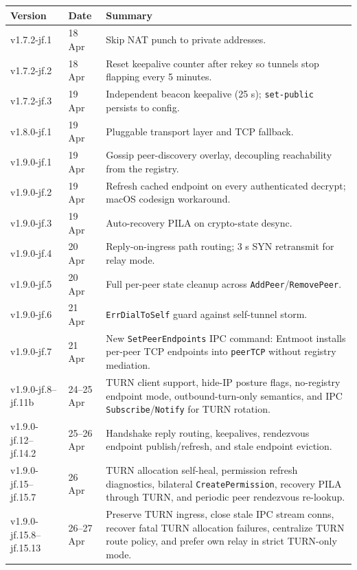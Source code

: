 \documentclass[11pt,a4paper]{article}
\begin{document}
\begin{table}[h]
\centering
\small
\begin{tabular}{@{}llp{7cm}@{}}
\toprule
Version & Date & Summary \\
\midrule
v1.7.2-jf.1 & 18 Apr & Skip NAT punch to private addresses. \\
v1.7.2-jf.2 & 18 Apr & Reset keepalive counter after rekey so tunnels stop flapping every 5 minutes. \\
v1.7.2-jf.3 & 19 Apr & Independent beacon keepalive (25 s); \texttt{set-public} persists to config. \\
v1.8.0-jf.1 & 19 Apr & Pluggable transport layer and TCP fallback. \\
v1.9.0-jf.1 & 19 Apr & Gossip peer-discovery overlay, decoupling reachability from the registry. \\
v1.9.0-jf.2 & 19 Apr & Refresh cached endpoint on every authenticated decrypt; macOS codesign workaround. \\
v1.9.0-jf.3 & 19 Apr & Auto-recovery PILA on crypto-state desync. \\
v1.9.0-jf.4 & 20 Apr & Reply-on-ingress path routing; 3 s SYN retransmit for relay mode. \\
v1.9.0-jf.5 & 20 Apr & Full per-peer state cleanup across \texttt{AddPeer}/\texttt{RemovePeer}. \\
v1.9.0-jf.6 & 21 Apr & \texttt{ErrDialToSelf} guard against self-tunnel storm. \\
v1.9.0-jf.7 & 21 Apr & New \texttt{SetPeerEndpoints} IPC command: Entmoot installs per-peer TCP endpoints into \texttt{peerTCP} without registry mediation. \\
v1.9.0-jf.8--jf.11b & 24--25 Apr & TURN client support, hide-IP posture flags, no-registry endpoint mode, outbound-turn-only semantics, and IPC \texttt{Subscribe}/\texttt{Notify} for TURN rotation. \\
v1.9.0-jf.12--jf.14.2 & 25--26 Apr & Handshake reply routing, keepalives, rendezvous endpoint publish/refresh, and stale endpoint eviction. \\
v1.9.0-jf.15--jf.15.7 & 26 Apr & TURN allocation self-heal, permission refresh diagnostics, bilateral \texttt{CreatePermission}, recovery PILA through TURN, and periodic peer rendezvous re-lookup. \\
v1.9.0-jf.15.8--jf.15.13 & 26--27 Apr & Preserve TURN ingress, close stale IPC stream conns, recover fatal TURN allocation failures, centralize TURN route policy, and prefer own relay in strict TURN-only mode. \\

\end{tabular}
\end{table}
\end{document}
